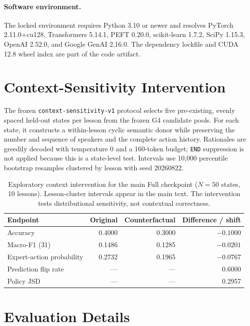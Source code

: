\documentclass[manuscript,review,anonymous]{acmart}
\begin{document}
\paragraph{Software environment.}
The locked environment requires Python 3.10 or newer and resolves PyTorch
2.11.0+cu128, Transformers 5.14.1, PEFT 0.20.0, scikit-learn 1.7.2, SciPy
1.15.3, OpenAI 2.52.0, and Google GenAI 2.16.0. The dependency lockfile and
CUDA 12.8 wheel index are part of the code artifact.

\section{Context-Sensitivity Intervention}
\label{sec:context-intervention}

The frozen \texttt{context-sensitivity-v1} protocol selects five pre-existing,
evenly spaced held-out states per lesson from the frozen G4 candidate pools.
For each state, it constructs a within-lesson cyclic semantic donor while
preserving the number and sequence of speakers and the complete action history.
Rationales are greedily decoded with temperature 0 and a 160-token budget;
\texttt{END} suppression is not applied because this is a state-level test.
Intervals use 10,000 percentile bootstrap resamples clustered by lesson with
seed 20260822.

\begin{table}[t]
\centering
\small
\begin{tabular}{lrrr}
\toprule
Endpoint & Original & Counterfactual & Difference / shift \\
\midrule
Accuracy & 0.4000 & 0.3000 & $-0.1000$ \\
Macro-F1 (31) & 0.1486 & 0.1285 & $-0.0201$ \\
Expert-action probability & 0.2732 & 0.1965 & $-0.0767$ \\
Prediction flip rate & --- & --- & 0.6000 \\
Policy JSD & --- & --- & 0.2957 \\
\bottomrule
\end{tabular}
\caption{Exploratory context intervention for the main Full checkpoint
($N=50$ states, 10 lessons). Lesson-cluster intervals appear in the main text.
The intervention tests distributional sensitivity, not contextual correctness.}
\label{tab:context-intervention}
\end{table}
 
\section{Evaluation Details}
\label{sec:evaluation-details}
\end{document}
